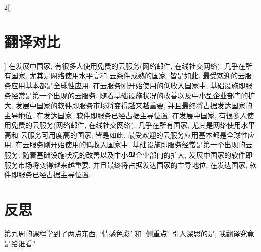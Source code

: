 \documentclass[a4paper, UTF8, 12pt]{article}
\begin{document}
\begin{paracol}{2}[\section{翻译对比}]
    \switchcolumn*
    在发展中国家, 有很多人使用免费的云服务(网络邮件, 在线社交网络). 几乎在所有国家, 尤其是网络使用水平高和{\color{red} 云条件成熟}的国家, 皆是如此. 最受欢迎的云服务应用基本都是全球性应用. 在云服务刚开始使用的低收入国家中, 基础设施即服务经常是第一个出现的云服务. 随着基础设施状况的改善以及中小型企业部门的扩大, 发展中国家的软件即服务市场将变得越来越重要, 并且最终将占据发达国家的主导地位. 在发达国家, 软件即服务已经占据主导位置.
    \switchcolumn
    在发展中国家, 有很多人使用免费的云服务(网络邮件, 在线社交网络). 几乎在所有国家, 尤其是网络使用水平高和{\color{red} 云服务可用度高}的国家, 皆是如此. 最受欢迎的云服务应用基本都是全球性应用. 在云服务刚开始使用的低收入国家中, 基础设施即服务经常是第一个出现的云服务. 随着基础设施状况的改善以及中小型企业部门的扩大, 发展中国家的软件即服务市场将变得越来越重要, 并且最终将占据发达国家的主导地位. 在发达国家, 软件即服务已经占据主导位置.

\end{paracol}

\section{反思}
第九周的课程学到了两点东西, `情感色彩' 和 `侧重点'. 引人深思的是, 我翻译究竟是给谁看? 
\end{document}
